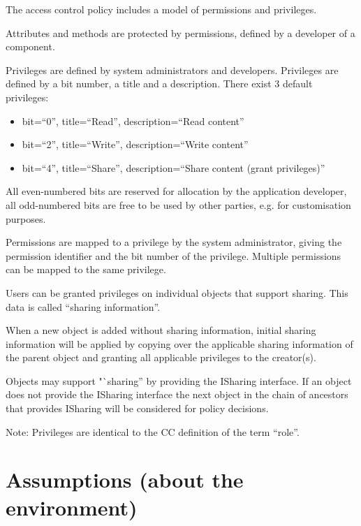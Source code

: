 \documentclass[12pt,english]{scrbook}
\begin{document}
The access control policy includes a model of permissions and privileges.

Attributes and methods are protected by permissions, defined by a developer of
a component.

Privileges are defined by system administrators and developers. Privileges are defined by a
bit number, a title and a description. There exist 3 default privileges:

\begin{itemize}
    \item bit=``0'', title=``Read'', description=``Read content''
    \item bit=``2'', title=``Write'', description=``Write content''
    \item bit=``4'', title=``Share'', description=``Share content (grant privileges)''
\end{itemize}

All even-numbered bits are reserved for allocation by the application
developer, all odd-numbered bits are free to be used by other parties, e.g.
for customisation purposes.

Permissions are mapped to a privilege by the system administrator, giving the
permission identifier and the bit number of the privilege. Multiple permissions
can be mapped to the same privilege.

Users can be granted privileges on individual objects that support sharing.
This data is called ``sharing information''.

When a new object is added without sharing information, initial sharing
information will be applied by copying over the applicable sharing information
of the parent object and granting all applicable privileges to the creator(s).

Objects may support "`sharing'' by providing the ISharing interface. If an
object does not provide the ISharing interface the next object in the chain of
ancestors that provides ISharing will be considered for policy decisions.

Note: Privileges are identical to the CC definition of the term ``role''.




\section{Assumptions (about the environment)}
\end{document}

